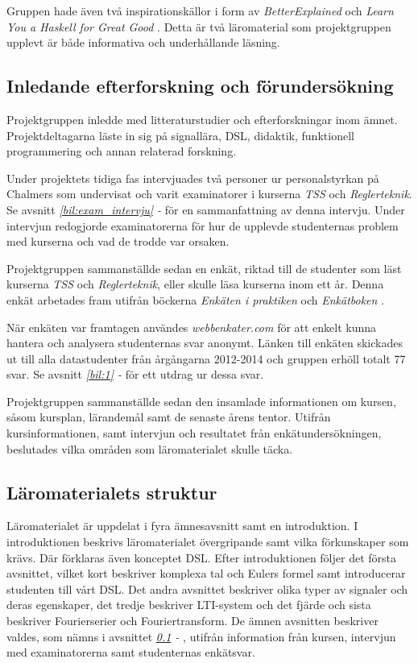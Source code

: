 \documentclass[12pt,a4paper,twoside,openright]{article}
\begin{document}
Gruppen hade även två inspirationskällor i form av
\textit{BetterExplained} \cite{betterexplained} och \textit{Learn You a Haskell for Great Good} \cite{learnyouahaskell}.
Detta är två läromaterial som projektgruppen upplevt är både
informativa och underhållande läsning.

\subsection{Inledande efterforskning och förundersökning}
\label{sec:efterforskning}

Projektgruppen inledde med litteraturstudier och efterforskningar inom
ämnet. Projektdeltagarna läste in sig på signallära, DSL, didaktik,
funktionell programmering och annan relaterad forskning.

Under projektets tidiga fas intervjuades två personer ur
personalstyrkan på Chalmers som undervisat och varit examinatorer i
kurserna \textit{TSS} och \textit{Reglerteknik}.
Se avsnitt \textit{\ref{bil:exam_intervju} - } för en sammanfattning av denna
intervju. Under intervjun redogjorde examinatorerna för hur de
upplevde studenternas problem med kurserna och vad de trodde var
orsaken.

Projektgruppen sammanställde sedan en enkät, riktad till de studenter
som läst kurserna \textit{TSS} och \textit{Reglerteknik}, eller skulle
läsa kurserna inom ett år. Denna enkät arbetades fram utifrån böckerna
\textit{Enkäten i praktiken} \cite{enkaten_i_praktiken} och \textit{Enkätboken} \cite{enkatboken}.

När enkäten var framtagen användes \textit{webbenkater.com} för att
enkelt kunna hantera och analysera studenternas svar anonymt.
Länken till enkäten skickades ut till alla datastudenter från
årgångarna 2012-2014 och gruppen erhöll totalt 77 svar. Se avsnitt
\textit{\ref{bil:1} - } för ett utdrag ur dessa svar.

Projektgruppen sammanställde sedan den insamlade informationen om
kursen, såsom kursplan, lärandemål samt de senaste årens
tentor. Utifrån kursinformationen, samt intervjun och resultatet från
enkätundersökningen, beslutades vilka områden som läromaterialet
skulle täcka.

\subsection{Läromaterialets struktur}
\label{sec:struktur}
Läromaterialet är uppdelat i fyra ämnesavsnitt samt en introduktion. I
introduktionen beskrivs läromaterialet övergripande samt vilka
förkunskaper som krävs. Där förklaras även konceptet DSL. Efter
introduktionen följer det första avsnittet, vilket kort beskriver
komplexa tal och Eulers formel samt introducerar studenten till vårt
DSL. Det andra avsnittet beskriver olika typer av signaler och deras
egenskaper, det tredje beskriver LTI-system och det fjärde och sista
beskriver Fourierserier och Fouriertransform. De ämnen avsnitten
beskriver valdes, som nämns i avsnittet \textit{\ref{sec:efterforskning} - }, utifrån information från
kursen, intervjun med examinatorerna samt studenternas enkätsvar.
\end{document}
